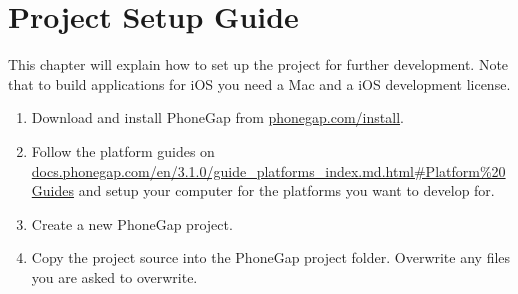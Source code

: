 \chapter{Project Setup Guide}

This chapter will explain how to set up the project for further development. Note that to build applications for iOS you need a Mac and a iOS development license\cite{iosCost}.

\begin{enumerate}
	\item{Download and install PhoneGap from \href{http://phonegap.com/install/}{phonegap.com/install}.}
	\item{Follow the platform guides on \newline \href{http://docs.phonegap.com/en/3.1.0/guide_platforms_index.md.html#Platform%20Guides}{docs.phonegap.com/en/3.1.0/guide\_platforms\_index.md.html\#Platform\%20Guides} and setup your computer for the platforms you want to develop for.}
	\item{Create a new PhoneGap project.}
	\item{Copy the project source into the PhoneGap project folder. Overwrite any files you are asked to overwrite.}
\end{enumerate}